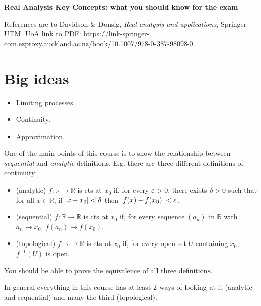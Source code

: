 \documentclass[a4paper,twoside]{article}
\newcommand{\R}{\mathbb{R}}
\begin{document}
  \begin{center}
    {\huge\textbf{Real Analysis Key Concepts: what you should know for the exam}}
  \end{center}

  References are to Davidson \& Donsig, \textit{Real analysis and applications}, Springer UTM. UoA link to PDF: \url{https://link-springer-com.ezproxy.auckland.ac.nz/book/10.1007/978-0-387-98098-0}.

  \section{Big ideas}
  \begin{itemize}
    \item Limiting processes.
    \item Continuity.
    \item Approximation.
  \end{itemize}

  One of the main points of this course is to show the relationship between \textit{sequential} and \textit{analytic} definitions. E.g. there are three different definitions of continuity:
  \begin{itemize}
    \item (analytic) $ f : \R \to \R $ is cts at $ x_0 $ if, for every $ \varepsilon > 0 $, there exists $ \delta > 0 $ such that for all $ x \in \R $, if $ \abs{x-x_0}<\delta $ then $ \abs{f(x)-f(x_0)}<\varepsilon $.
    \item (sequential) $ f : \R \to \R $ is cts at $ x_0 $ if, for every sequence $ (a_n) $ in $ \R $ with $ a_n \to x_0 $, $ f(a_n) \to f(x_0) $.
    \item (topological) $ f : \R \to \R $ is cts at $ x_0 $ if, for every open set $ U $ containing $ x_0 $, $ f^{-1}(U) $ is open.
  \end{itemize}
  You should be able to prove the equivalence of all three definitions.

  In general everything in this course has at least 2 ways of looking at it (analytic and sequential) and many the third (topological).
\end{document}
